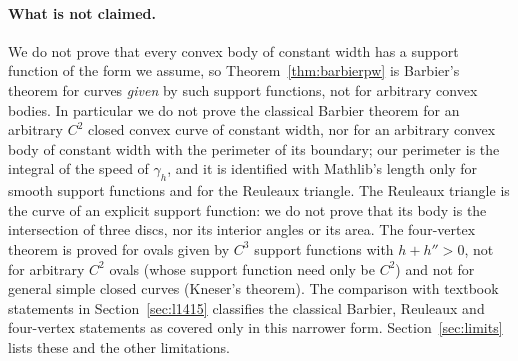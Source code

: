 \documentclass[11pt]{article}
\theoremstyle{definition}
\theoremstyle{remark}
\begin{document}
\paragraph{What is not claimed.} We do not prove that every convex body of constant width has a
support function of the form we assume, so Theorem~\ref{thm:barbierpw} is Barbier's theorem for
curves \emph{given} by such support functions, not for arbitrary convex bodies. In particular we do
not prove the classical Barbier theorem for an arbitrary $C^2$ closed convex curve of constant width,
nor for an arbitrary convex body of constant width with the perimeter of its boundary; our perimeter
is the integral of the speed of $\gamma_h$, and it is identified with Mathlib's length only for
smooth support functions and for the Reuleaux triangle. The Reuleaux triangle is the curve of an
explicit support function: we do not prove that its body is the intersection of three discs, nor
its interior angles or its area. The four-vertex
theorem is proved for ovals given by $C^3$ support functions with $h+h''>0$, not for arbitrary
$C^2$ ovals (whose support function need only be $C^2$) and not for general
simple closed curves (Kneser's theorem). The comparison with textbook statements in
Section~\ref{sec:l1415} classifies the classical Barbier, Reuleaux and four-vertex statements as
covered only in this narrower form. Section~\ref{sec:limits} lists these and the other limitations.
\end{document}
